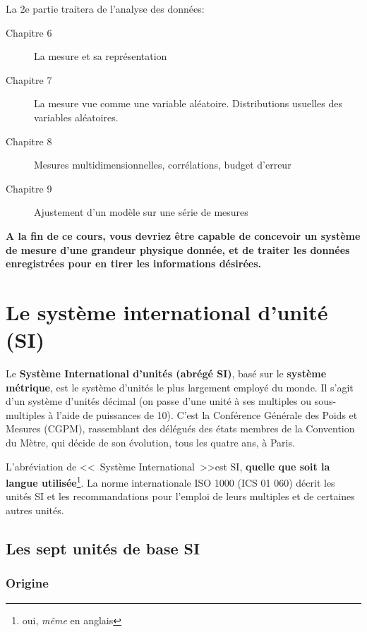 La 2e partie traitera de l'analyse des données:
\begin{description}
\item[Chapitre 6] La mesure et sa représentation
\item[Chapitre 7] La mesure vue comme une variable aléatoire. Distributions usuelles des
variables aléatoires.
\item[Chapitre 8] Mesures multidimensionnelles, corrélations, budget d'erreur
\item[Chapitre 9] Ajustement d'un modèle sur une série de mesures
\end{description}

\textbf{A la fin de ce cours, vous devriez être capable de concevoir un système de mesure d'une grandeur physique donnée, et de traiter les données enregistrées pour en tirer les informations désirées.}

\chapter{Le système international d'unité (SI)}

Le \textbf{Système International d'unités (abrégé SI)}, basé sur le \textbf{système métrique}, est le système d'unités le plus largement employé du monde. Il s'agit d'un système d'unités décimal (on passe d'une unité à ses multiples ou sous-multiples à l'aide de puissances de 10). C'est la Conférence Générale des Poids et Mesures (CGPM), rassemblant des délégués des états membres de la Convention du Mètre, qui décide de son évolution, tous les quatre ans, à Paris.

L'abréviation de \textless\textless\ Système International\ \textgreater\textgreater est SI, \textbf{quelle que soit la langue utilisée}\footnote{oui, \textit{même} en anglais}. La norme internationale ISO 1000 (ICS 01 060) décrit les unités SI et les recommandations pour l'emploi de leurs multiples et de certaines autres unités.

\section{Les sept unités de base SI}

\subsection{Origine}

